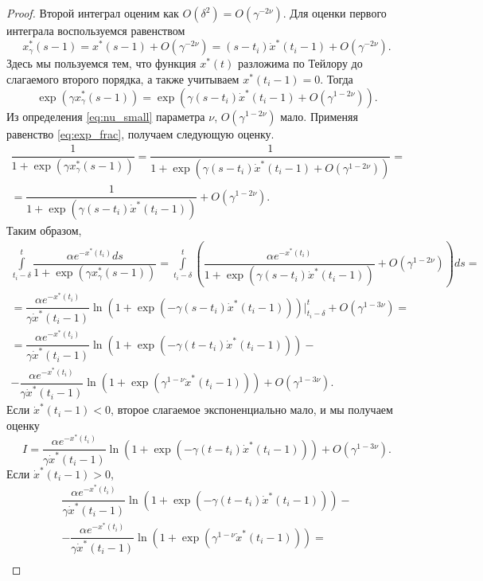 \begin{proof}
	Второй интеграл оценим как $O(\delta^2) = O(\gamma^{-2\nu})$. Для оценки первого интеграла воспользуемся равенством
	\[
	x^*_{\gamma}(s - 1) = x^*(s - 1) + O(\gamma^{-2\nu}) = (s - t_i)\dot{x}^*(t_i - 1) + O(\gamma^{-2\nu}).
	\]
	Здесь мы пользуемся тем, что функция $x^*(t)$ разложима по Тейлору до слагаемого второго порядка, а также учитываем $x^*(t_i - 1) = 0$. %
	Тогда 
	\[
	\exp(\gamma x^*_{\gamma}(s - 1)) = \exp\left(\gamma(s - t_i)\dot{x}^*(t_i - 1) + O(\gamma^{1 - 2\nu})\right).
	\]
	Из определения \eqref{eq:nu_small} параметра $\nu$, $O(\gamma^{1 - 2\nu})$ мало. Применяя равенство \eqref{eq:exp_frac}, получаем следующую оценку.
	\begin{multline*}
	\dfrac{1}{1 + \exp(\gamma x^*_{\gamma}(s - 1))} = \dfrac{1}{1 + \exp(\gamma (s - t_i) \dot{x}^*(t_i - 1) + O(\gamma^{1 - 2\nu}))} =\\= \dfrac{1}{1 + \exp(\gamma(s - t_i)\dot{x}^*(t_i - 1))} + O(\gamma^{1 - 2\nu}).
	\end{multline*}
	Таким образом,
	\begin{multline*}
	\int\limits_{t_i - \delta}^{t} \dfrac{\alpha e^{-x^*(t_i)} ds}{1 + \exp(\gamma x^*_{\gamma}(s - 1))} = \int\limits_{t_i - \delta}^{t} \left(\dfrac{\alpha e^{-x^*(t_i)}}{1 + \exp(\gamma(s - t_i)\dot{x}^*(t_i - 1))} + O(\gamma^{1 - 2\nu})\right) ds =\\
	= \dfrac{\alpha e^{-x^*(t_i)}}{\gamma \dot{x}^*(t_i - 1)}\ln\left(1 + \exp(-\gamma(s - t_i)\dot{x}^*(t_i - 1))\right)\bigg\vert_{t_i - \delta}^t + O(\gamma^{1 - 3\nu}) = \\
	= \dfrac{\alpha e^{-x^*(t_i)}}{\gamma \dot{x}^*(t_i - 1)}\ln\left(1 + \exp(-\gamma(t - t_i)\dot{x}^*(t_i - 1))\right) -\\- \dfrac{\alpha e^{-x^*(t_i)}}{\gamma \dot{x}^*(t_i - 1)}\ln\left(1 + \exp(\gamma^{1 - \nu}\dot{x}^*(t_i - 1))\right) + O(\gamma^{1 - 3\nu}).
	\end{multline*}
	Если $\dot{x}^*(t_i - 1) < 0$, второе слагаемое экспоненциально мало, и мы получаем оценку 
	\begin{equation}
	\label{eq:I_estimate_dotx_less_0}
	I = \dfrac{\alpha e^{-x^*(t_i)}}{\gamma \dot{x}^*(t_i - 1)}\ln\left(1 + \exp(-\gamma(t - t_i)\dot{x}^*(t_i - 1))\right) + O(\gamma^{1 - 3\nu}).
	\end{equation}
	Если $\dot{x}^*(t_i - 1) > 0$, 
	\begin{multline}
	\dfrac{\alpha e^{-x^*(t_i)}}{\gamma \dot{x}^*(t_i - 1)}\ln\left(1 + \exp(-\gamma(t - t_i)\dot{x}^*(t_i - 1))\right) -\\- \dfrac{\alpha e^{-x^*(t_i)}}{\gamma \dot{x}^*(t_i - 1)}\ln\left(1 + \exp(\gamma^{1 - \nu}\dot{x}^*(t_i - 1))\right) =\\

\end{multline}
\end{proof}
